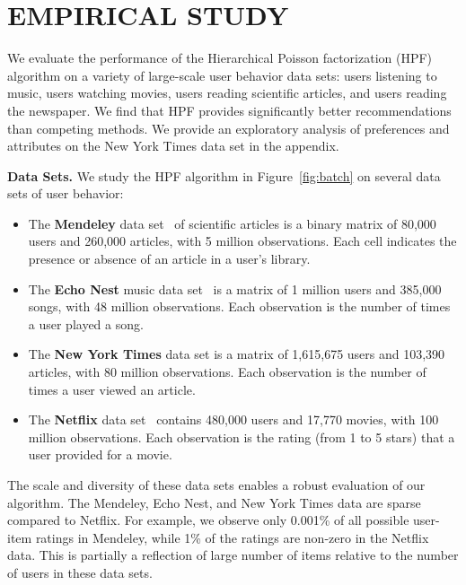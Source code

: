 \section{EMPIRICAL STUDY}
\label{sec:eval}
We evaluate the performance of the Hierarchical Poisson factorization
(HPF) algorithm on a variety of large-scale user behavior data sets:
users listening to music, users watching movies, users reading
scientific articles, and users reading the newspaper.  We find that
HPF provides significantly better recommendations than competing
methods. We provide an exploratory analysis of preferences and
attributes on the New York Times data set in the appendix.

{\bf Data Sets.} We study the HPF algorithm in Figure~\ref{fig:batch}
on several data sets of user behavior:
\begin{itemize}
\item The {\bf Mendeley} data set~\cite{Jack:2010} of scientific
  articles is a binary matrix of 80,000 users and 260,000 articles,
  with 5 million observations. Each cell indicates the presence or absence of an article
  in a user's library.

\item The {\bf Echo Nest} music data set~\cite{Bertin-Mahieux:2011} is
  a matrix of 1 million users and 385,000 songs, with 48 million
  observations.  Each observation is the number of times a user played
  a song.
\item The {\bf New York Times} data set is a matrix of 1,615,675 users
  and 103,390 articles, with 80 million observations.  Each
  observation is the number of times a user viewed an article.

\item The {\bf Netflix} data set~\cite{Koren:2009} contains 480,000
  users and 17,770 movies, with 100 million observations. Each
  observation is the rating (from 1 to 5 stars) that a user provided
  for a movie.
\end{itemize}

The scale and diversity of these data sets enables a robust evaluation
of our algorithm. The Mendeley, Echo Nest, and New York Times data
are sparse compared to Netflix. For example, we observe
only 0.001\% of all possible user-item ratings in Mendeley, while 1\%
of the ratings are non-zero in the Netflix data. This is partially a
reflection of large number of items relative to the number of users in these
data sets.

